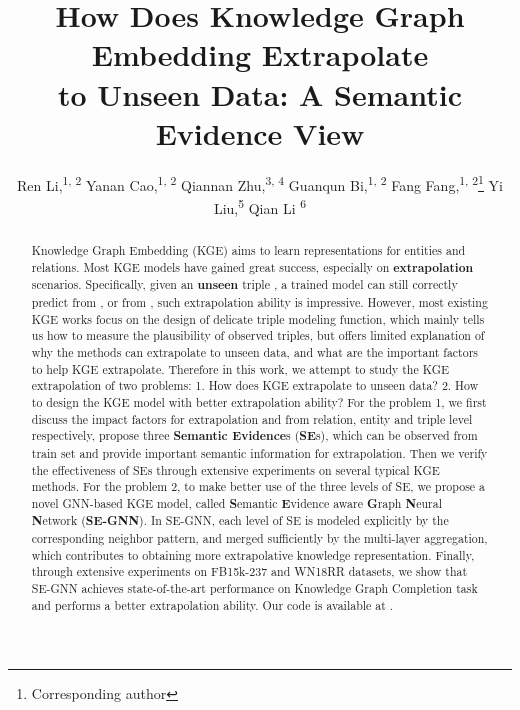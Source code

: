 \documentclass[letterpaper]{article} \usepackage{aaai22}  \usepackage{times}  \usepackage{helvet}  \usepackage{courier}  \usepackage[hyphens]{url}  \usepackage{graphicx} \urlstyle{rm} \def\UrlFont{\rm}  \usepackage{natbib}  \usepackage{caption} \DeclareCaptionStyle{ruled}{labelfont=normalfont,labelsep=colon,strut=off} \frenchspacing  \setlength{\pdfpagewidth}{8.5in}  \setlength{\pdfpageheight}{11in}  \usepackage{algorithm}
\title{How Does Knowledge Graph Embedding Extrapolate\\ to Unseen Data: A Semantic Evidence View}
\author{
    Ren Li,\textsuperscript{\rm 1, 2} 
    Yanan Cao,\textsuperscript{\rm 1, 2} 
    Qiannan Zhu,\textsuperscript{\rm 3, 4} 
    Guanqun Bi,\textsuperscript{\rm 1, 2}
    Fang Fang,\textsuperscript{\rm 1, 2}\thanks{Corresponding author}
    Yi Liu,\textsuperscript{\rm 5}
    Qian Li \textsuperscript{\rm 6}
}
\begin{document}
\maketitle

\begin{abstract}
Knowledge Graph Embedding (KGE) aims to learn representations for entities and relations. 
Most KGE models have gained great success, especially on \textbf{extrapolation} scenarios. Specifically, given an \textbf{unseen} triple , a trained model can still correctly predict  from , or  from , such extrapolation ability is impressive.
However, most existing KGE works focus on the design of delicate triple modeling function, which mainly tells us how to measure the plausibility of observed triples, but offers limited explanation of why the methods can extrapolate to unseen data, and what are the important factors to help KGE extrapolate. 
Therefore in this work, we attempt to study the KGE extrapolation of two problems: 1. How does KGE extrapolate to unseen data? 2. How to design the KGE model with better extrapolation ability? 
For the problem 1, we first discuss the impact factors for extrapolation and from relation, entity and triple level respectively, propose three \textbf{Semantic Evidence}s (\textbf{SE}s), which can be observed from train set and provide important semantic information for extrapolation. Then we verify the effectiveness of SEs through extensive experiments on several typical KGE methods.
For the problem 2, to make better use of the three levels of SE, we propose a novel GNN-based KGE model, called \textbf{S}emantic \textbf{E}vidence aware \textbf{G}raph \textbf{N}eural \textbf{N}etwork (\textbf{SE-GNN}). In SE-GNN, each level of SE is modeled explicitly by the corresponding neighbor pattern, and merged sufficiently by the multi-layer aggregation, which contributes to obtaining more extrapolative knowledge representation. 
Finally, through extensive experiments on FB15k-237 and WN18RR datasets, we show that SE-GNN achieves state-of-the-art performance on Knowledge Graph Completion task and performs a better extrapolation ability. Our code is available at .
\end{abstract}
\end{document}
